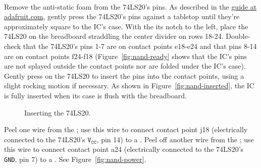 \disconnect\

Remove the anti-static foam from the 74LS20's pins. As described in the
\href{https://learn.adafruit.com/breadboards-for-beginners/breadboard-usage}{guide
at adafruit.com}, gently press the 74LS20's pins against a tabletop until
they're approximately square to the IC's case. With the its notch to the left,
place the 74LS20 on the breadboard straddling the center divider on rows 18-24.
Double-check that the 74LS20's pins 1-7 are on contact points e18-e24 and that
pins 8-14 are on contact points f24-f18 (Figure~\ref{fig:nand-ready} shows that
the IC's pins are not splayed outside the contact points nor are folded under
the IC's case). Gently press on the 74LS20 to insert the pins into the contact
points, using a slight rocking motion if necessary. As shown in
Figure~\ref{fig:nand-inserted}, the IC is fully inserted when its case is flush
with the breadboard.

\begin{figure}
    \centering
    \hfil
    \caption{Inserting the 74LS20.}
\end{figure}

Peel one wire from the \rainbow; use this wire to connect contact point j18
(electrically connected to the 74LS20's $\mathtt{V_{CC}}$, pin 14) to a \power.
Peel off another wire from the \rainbow; use this wire to connect contact point
a24 (electrically connected to the 74LS20's \texttt{GND}, pin 7) to a \ground.
See Figure~\ref{fig:nand-power}.

